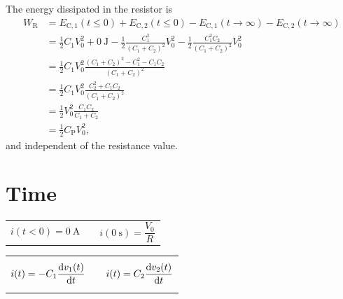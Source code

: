 \documentclass{article}[11pt]
\begin{document}
The energy dissipated in the resistor is
\begin{equation}
\begin{split}
W_{\mathrm{R}} & = E_{\mathrm{C,1}}(t\leq0)         + E_{\mathrm{C,2}}(t\leq0) - E_{\mathrm{C,1}}(t\rightarrow \infty)                  - E_{\mathrm{C,2}}(t\rightarrow \infty)                      \\
               & = \frac{1}{2} C_1 V_{\mathrm{0}}^2 + \SI{0}{\joule}           - \frac{1}{2} \frac{C_1^3}{(C_1+C_2)^2} V_{\mathrm{0}}^2 - \frac{1}{2} \frac{C_1^2 C_2}{(C_1+C_2)^2} V_{\mathrm{0}}^2 \\
               & = \frac{1}{2} C_1 V_{\mathrm{0}}^2 \frac{(C_1+C_2)^2-C_1^2-C_1 C_2}{(C_1+C_2)^2}                                                                                                    \\
               & = \frac{1}{2} C_1 V_{\mathrm{0}}^2 \frac{C_2^2+C_1 C_2}{(C_1+C_2)^2}                                                                                                                \\
               & = \frac{1}{2} V_{\mathrm{0}}^2 \frac{C_1 C_2}{C_1+C_2}                                                                                                                              \\
               & = \frac{1}{2} C_{\mathrm{P}} V_{\mathrm{0}}^2,            
\end{split}
\end{equation}
and independent of the resistance value.


\section{Time}

\begin{center}
\begin{tabular}{p{4cm}p{2cm}p{4cm}}
  \begin{equation}
    i(t<0)=\SI{0}{\ampere}
  \end{equation}
  &
  &
  \begin{equation}
    i(\SI{0}{\second})=\frac{V_{\mathrm{0}}}{R}
  \end{equation}
\end{tabular}
\end{center}


\begin{center}
\begin{tabular}{p{4cm}p{2cm}p{4cm}}
  \begin{equation}
    i(t)= -C_1 \dv{v_1(t)}{t}
  \end{equation}
  &
  &
  \begin{equation}
    i(t)= C_2 \dv{v_2(t)}{t}
  \end{equation}
\end{tabular}
\end{center}
\end{document}
